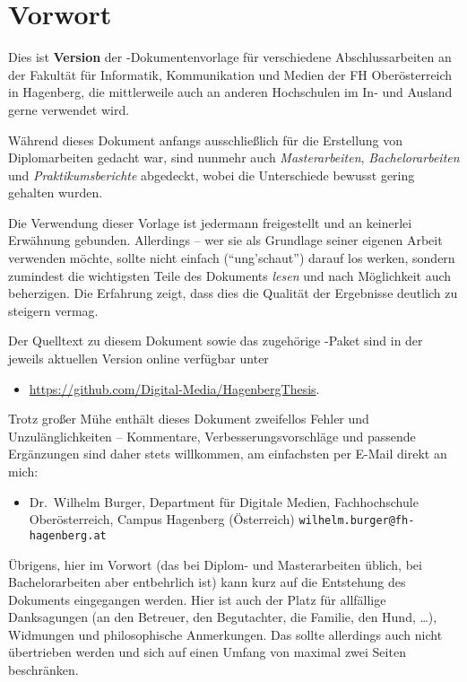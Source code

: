 \chapter{Vorwort} 	%


Dies ist \textbf{Version \hgbthesisDate} der \latex-Dokumentenvorlage für 
verschiedene Abschlussarbeiten an der Fakultät für Informatik, Kommunikation
und Medien der FH Oberösterreich in Hagenberg, die mittlerweile auch 
an anderen Hochschulen im In- und Ausland gerne verwendet wird.

Während dieses Dokument anfangs ausschließlich für die Erstellung
von Diplomarbeiten gedacht war, sind nunmehr auch  
\emph{Masterarbeiten}, \emph{Bachelor\-arbeiten} und \emph{Praktikumsberichte} 
abgedeckt, wobei die Unterschiede bewusst gering gehalten wurden.

Die Verwendung dieser Vorlage ist jedermann freigestellt und an
keinerlei Erwähnung gebunden. Allerdings -- wer sie als Grundlage
seiner eigenen Arbeit verwenden möchte, sollte nicht einfach
("`ung'schaut"') darauf los werken, sondern zumindest die
wichtigsten Teile des Dokuments \emph{lesen} und nach Möglichkeit
auch beherzigen. Die Erfahrung zeigt, dass dies die Qualität der
Ergebnisse deutlich zu steigern vermag.

Der Quelltext zu diesem Dokument sowie das zugehörige
\latex-Paket sind in der jeweils aktuellen Version online
verfügbar unter
%
\begin{itemize}
\item[]\url{https://github.com/Digital-Media/HagenbergThesis}.
\end{itemize}
%
Trotz großer Mühe enthält dieses Dokument zweifellos Fehler und Unzulänglichkeiten
-- Kommentare, Verbesserungsvorschläge und passende Ergänzungen
sind daher stets willkommen, am einfachsten per E-Mail direkt an mich:
\begin{itemize}
\item[]%

Dr.\ Wilhelm Burger, Department für Digitale Medien,\newline
Fachhochschule Oberösterreich, Campus Hagenberg (Österreich)\newline
\nolinkurl{wilhelm.burger@fh-hagenberg.at}
\end{itemize}

\noindent
Übrigens, hier im Vorwort (das bei Diplom- und Masterarbeiten üblich, bei Bachelorarbeiten 
aber entbehrlich ist) kann kurz auf die Entstehung des Dokuments eingegangen werden.
Hier ist auch der Platz für allfällige Danksagungen (\zB an den Betreuer, 
den Begutachter, die Familie, den Hund, \ldots), Widmungen und philosophische 
Anmerkungen. Das sollte allerdings auch nicht übertrieben werden und sich auf 
einen Umfang von maximal zwei Seiten beschränken.




